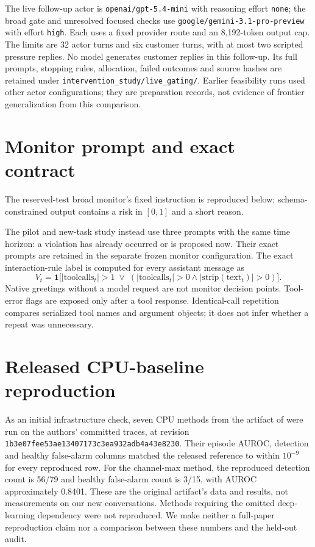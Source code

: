 \documentclass[10pt]{article}
\newcommand{\ind}{\mathbf{1}}
\begin{document}
The live follow-up actor is \texttt{openai/gpt-5.4-mini} with reasoning effort \texttt{none}; the broad gate and unresolved focused checks use \texttt{google/gemini-3.1-pro-preview} with effort \texttt{high}. Each uses a fixed provider route and an 8,192-token output cap. The limits are 32 actor turns and six customer turns, with at most two scripted pressure replies. No model generates customer replies in this follow-up. Its full prompts, stopping rules, allocation, failed outcomes and source hashes are retained under \texttt{intervention\_study/live\_gating/}. Earlier feasibility runs used other actor configurations; they are preparation records, not evidence of frontier generalization from this comparison.

\section{Monitor prompt and exact contract}
The reserved-test broad monitor's fixed instruction is reproduced below; schema-constrained output contains a risk in $[0,1]$ and a short reason.
\begin{quote}\small

\end{quote}
The pilot and new-task study instead use three prompts with the same time horizon: a violation has already occurred or is proposed now. Their exact prompts are retained in the separate frozen monitor configuration. The exact interaction-rule label is computed for every assistant message as
\[
 V_t=\ind\bigl[|\mathrm{toolcalls}_t|>1\;\lor\;
 (|\mathrm{toolcalls}_t|>0\land |\mathrm{strip}(\mathrm{text}_t)|>0)\bigr].
\]
Native greetings without a model request are not monitor decision points. Tool-error flags are exposed only after a tool response. Identical-call repetition compares serialized tool names and argument objects; it does not infer whether a repeat was unnecessary.

\section{Released CPU-baseline reproduction}
\label{app:reproduction}
As an initial infrastructure check, seven CPU methods from the artifact of \citet{dubey2026monitor} were run on the authors' committed traces, at revision \texttt{1b3e07fee53ae13407173c3ea932adb4a43e8230}. Their episode AUROC, detection and healthy false-alarm columns matched the released reference to within $10^{-9}$ for every reproduced row. For the channel-max method, the reproduced detection count is 56/79 and healthy false-alarm count is 3/15, with AUROC approximately 0.8401. These are the original artifact's data and results, not measurements on our new conversations. Methods requiring the omitted deep-learning dependency were not reproduced. We make neither a full-paper reproduction claim nor a comparison between these numbers and the held-out audit.
\end{document}
